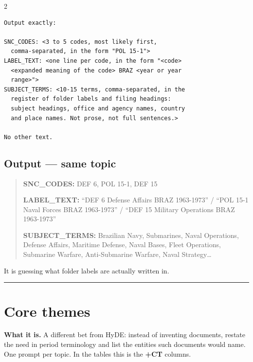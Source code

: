 \documentclass[a4paper,11pt]{article}
\newcommand{\partrule}{\vspace{2pt}\hrule\vspace{6pt}}
\begin{document}
\begin{multicols}{2}
{\begin{verbatim}
Output exactly:

SNC_CODES: <3 to 5 codes, most likely first,
  comma-separated, in the form "POL 15-1">
LABEL_TEXT: <one line per code, in the form "<code>
  <expanded meaning of the code> BRAZ <year or year
  range>">
SUBJECT_TERMS: <10-15 terms, comma-separated, in the
  register of folder labels and filing headings:
  subject headings, office and agency names, country
  and place names. Not prose, not full sentences.>

No other text.
\end{verbatim}
}

\subsection*{Output --- same topic}

\begin{quote}
\textbf{SNC\_CODES:} DEF 6, POL 15-1, DEF 15

\textbf{LABEL\_TEXT:} ``DEF 6 Defense Affairs BRAZ 1963-1973'' / ``POL 15-1 Naval Forces BRAZ
1963-1973'' / ``DEF 15 Military Operations BRAZ 1963-1973''

\textbf{SUBJECT\_TERMS:} Brazilian Navy, Submarines, Naval Operations, Defense Affairs,
Maritime Defense, Naval Bases, Fleet Operations, Submarine Warfare, Anti-Submarine Warfare,
Naval Strategy\ldots
\end{quote}

It is guessing what folder labels are actually written in.

\partrule

\section{Core themes}

\textbf{What it is.} A different bet from HyDE: instead of inventing documents, restate the
need in period terminology and list the entities such documents would name. One prompt per
topic. In the tables this is the \textbf{+CT} columns.



\end{multicols}
\end{document}
